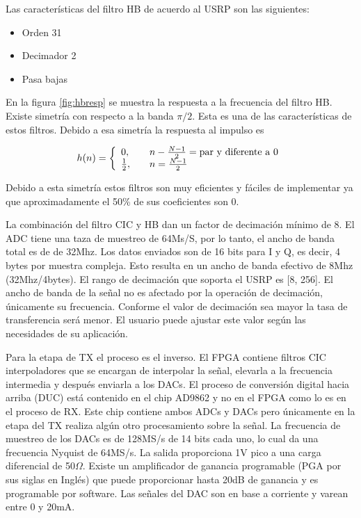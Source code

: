 Las caracter\'isticas del filtro HB de acuerdo al USRP son las siguientes:

\begin{itemize}
  \item Orden 31
  \item Decimador 2
  \item Pasa bajas
\end{itemize}

En la figura \ref{fig:hbresp} se muestra la respuesta a la frecuencia del filtro HB.
Existe simetr\'ia con respecto a la banda $\pi /2$. Esta es una de las
caracter\'isticas de estos filtros. Debido a esa simetr\'ia la respuesta al
impulso es

\begin{equation}
h(n)=\left\{
\begin{array}{l l}
0, & \quad n-\frac{N-1}{2}=\text{par y diferente a 0}\\
\frac{1}{2}, & \quad n=\frac{N-1}{2}
\end{array}\right.
\end{equation}

Debido a esta simetr\'ia estos filtros son muy eficientes y f\'aciles de implementar ya que aproximadamente el 50\% de sus
coeficientes son 0.

La combinaci\'on del filtro CIC y HB dan un factor de decimaci\'on m\'inimo de 8. El ADC tiene una taza de muestreo de 64Ms/S, por
lo tanto, el ancho de banda total es de de 32Mhz. Los datos enviados son de 16 bits para I y Q, es decir, 4 bytes por muestra
compleja. Esto resulta en un ancho de banda efectivo de 8Mhz (32Mhz/4bytes). El rango de decimaci\'on que soporta el USRP es [8,
256]. El ancho de banda de la se\~nal no es afectado por la operaci\'on de decimaci\'on, \'unicamente su frecuencia. Conforme el
valor de decimaci\'on sea mayor la tasa de transferencia ser\'a menor. El usuario puede ajustar este valor seg\'un las necesidades
de su aplicaci\'on.

Para la etapa de TX el proceso es el inverso. El FPGA contiene filtros CIC interpoladores que se encargan de interpolar la
se\~nal, elevarla a la frecuencia intermedia y despu\'es enviarla a los DACs. El proceso de conversi\'on digital hacia arriba (DUC)
est\'a contenido en el chip AD9862 y no en el FPGA como lo es en el proceso de RX. Este chip contiene ambos ADCs y DACs pero
\'unicamente en la etapa del TX realiza alg\'un otro procesamiento sobre la se\~nal. La frecuencia de muestreo de los DACs es de
128MS/s de 14 bits cada uno, lo cual da una frecuencia Nyquist de 64MS/s. La salida proporciona 1V pico a una carga diferencial
de 50$\Omega$. Existe un amplificador de ganancia programable (PGA por sus siglas en Ingl\'es) que puede proporcionar hasta 20dB
de ganancia y es programable por software. Las se\~nales del DAC son en base a corriente y varean entre 0 y 20mA.

